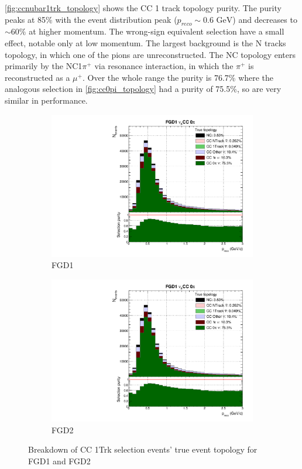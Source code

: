 \autoref{fig:ccnubar1trk_topology} shows the \numubar CC 1 track topology purity. The purity peaks at 85\% with the event distribution peak ($p_{reco}\sim 0.6\text{ GeV}$) and decreases to $\sim60\%$ at higher momentum. The wrong-sign \numu equivalent selection have a small effect, notable only at low momentum. The largest background is the \numubar N tracks topology, in which one of the pions are unreconstructed. The NC topology enters primarily by the NC1$\pi^+$ via resonance interaction, in which the $\pi^+$ is reconstructed as a $\mu^+$. Over the whole range the purity is 76.7\% where the analogous \numu selection in \autoref{fig:cc0pi_topology} had a purity of 75.5\%, so are very similar in performance.
\begin{figure}[h]
	\begin{subfigure}[t]{0.49\textwidth}
		\includegraphics[width=\textwidth,page=13, trim={0mm 0mm 0mm 9mm}, clip]{figures/mach3/selection/2017b_Diag_WithSelection}
		\caption{FGD1}
	\end{subfigure}
	\begin{subfigure}[t]{0.49\textwidth}
		\includegraphics[width=\textwidth,page=17, trim={0mm 0mm 0mm 9mm}, clip]{figures/mach3/selection/2017b_Diag_WithSelection}
		\caption{FGD2}
	\end{subfigure}
	\caption{Breakdown of \numubar CC 1Trk selection events' true event topology for FGD1 and FGD2 }
	\label{fig:ccnubar1trk_topology}
\end{figure}

